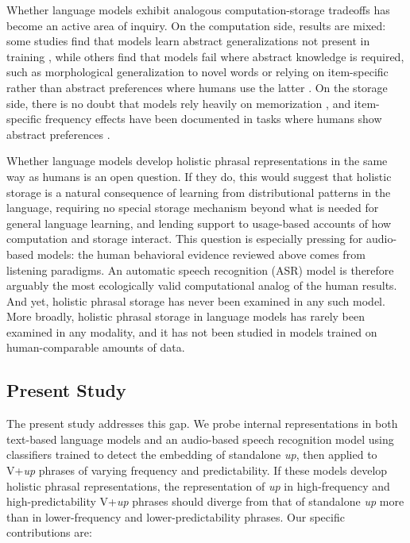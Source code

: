 \documentclass[11pt]{article}
\begin{document}
Whether language models exhibit analogous computation-storage tradeoffs
has become an active area of inquiry. On the computation side, results
are mixed: some studies find that models learn abstract generalizations
not present in training
\citep{misraLanguageModelsLearn2024, yaoBothDirectIndirect2025}, while
others find that models fail where abstract knowledge is required, such
as morphological generalization to novel words
\citep{haleyThisBERTNow2020} or relying on item-specific rather than
abstract preferences where humans use the latter
\citep{houghton2025roleabstractrepresentations, lasriSubjectVerbAgreement2022}.
On the storage side, there is no doubt that models rely heavily on
memorization \citep{mccoy2023howmuchlanguage}, and item-specific
frequency effects have been documented in tasks where humans show
abstract preferences \citep{houghton2025roleabstractrepresentations}.

Whether language models develop holistic phrasal representations in the
same way as humans is an open question. If they do, this would suggest
that holistic storage is a natural consequence of learning from
distributional patterns in the language, requiring no special storage
mechanism beyond what is needed for general language learning, and
lending support to usage-based accounts of how computation and storage
interact. This question is especially pressing for audio-based models:
the human behavioral evidence reviewed above comes from listening
paradigms. An automatic speech recognition (ASR) model is therefore
arguably the most ecologically valid computational analog of the human
results. And yet, holistic phrasal storage has never been examined in
any such model. More broadly, holistic phrasal storage in language
models has rarely been examined in any modality, and it has not been
studied in models trained on human-comparable amounts of data.

\subsection{Present Study}\label{present-study}

The present study addresses this gap. We probe internal representations
in both text-based language models and an audio-based speech recognition
model using classifiers trained to detect the embedding of standalone
\emph{up}, then applied to V+\emph{up} phrases of varying frequency and
predictability. If these models develop holistic phrasal
representations, the representation of \emph{up} in high-frequency and
high-predictability V+\emph{up} phrases should diverge from that of
standalone \emph{up} more than in lower-frequency and
lower-predictability phrases. Our specific contributions are:
\end{document}
